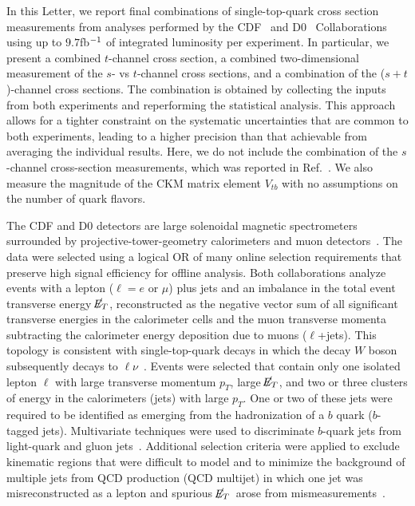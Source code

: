 \documentclass[aps,prl,twocolumn,showpacs,superscriptaddress,groupedaddress]{revtex4}  %
\newcommand{\MET}{\mbox{$\raisebox{.3ex}{$\not\!$}E_T$}}
\newcommand{\ljets}     {\mbox{$\ell$+jets}\xspace}
\begin{document}
 
In this Letter, we report final combinations of single-top-quark cross 
section measurements from analyses performed by the
CDF~\cite{cdf_channels} and D0~\cite{d0_schannel} Collaborations using
up to $9.7$\;fb$\rm ^{-1}$ of integrated luminosity per experiment. In
particular, we present a combined $t$-channel cross section, a
combined two-dimensional measurement of the $s$- vs $t$-channel
cross sections, and a combination of the ($s+t$)-channel cross
sections. The combination is obtained by collecting the inputs from
both experiments and reperforming the statistical analysis. This
approach allows for a tighter constraint on the systematic
uncertainties that are common to both experiments, leading to a higher
precision than that achievable from averaging the individual
results. Here, we do not include the combination of the $s$-channel
cross-section measurements, which was reported in
Ref.~\cite{tev_schannel}. We also measure the magnitude of the CKM
matrix element $V_{tb}$ with no assumptions on the number of quark
flavors.

The CDF and D0 detectors are large solenoidal magnetic spectrometers
surrounded by projective-tower-geometry calorimeters and muon
detectors~\cite{CDFII,D0II}. The data were selected using a logical OR
of many online selection requirements that preserve high signal
efficiency for offline analysis. Both collaborations analyze events
with a lepton ($\ell =e$ or $\mu$) plus jets and an imbalance in the
total event transverse energy \MET, reconstructed as the negative
vector sum of all significant transverse energies in the calorimeter
cells and the muon transverse momenta subtracting the calorimeter
energy deposition due to muons (\ljets). This topology is consistent 
with single-top-quark decays in which the decay $W$ boson subsequently
decays to $\ell \nu$~\cite{cdf_channels_7.5,d0_schannel}. Events were
selected that contain only one isolated lepton $\ell$ with large
transverse momentum $p_T$, large \MET, and two or three
clusters of energy in the calorimeters (jets) with large $p_T$. One or
two of these jets were required to be identified as emerging from the 
hadronization of a $b$ quark ($b$-tagged jets). Multivariate
techniques were used to discriminate $b$-quark jets from
light-quark and gluon jets~\cite{CDFbtag,D0btag}. Additional selection criteria were
applied to exclude kinematic regions that were difficult to model and
to minimize the background of multiple jets from QCD production (QCD
multijet) in which one jet was misreconstructed as a lepton and
spurious \MET\ arose from mismeasurements~\cite{cdf_channels_7.5,d0_schannel}. 
\end{document}
